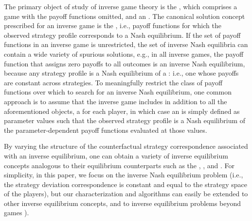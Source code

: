 The primary object of study of inverse game theory is the , which comprises a 
game with the 
payoff functions omitted, and an .
The canonical solution concept prescribed for an inverse game is the , i.e., payoff functions 
for which the observed strategy profile corresponds to a Nash equilibrium.
%
%
If the set of payoff functions in an inverse game is unrestricted, the set of inverse Nash equilibria can contain a wide variety of spurious solutions, e.g., in all inverse games, the payoff function that assigns zero payoffs to all outcomes is an inverse Nash equilibrium, because any strategy profile is a Nash equilibrium of a : i.e., one whose payoffs are constant across strategies. 
To meaningfully restrict the class of payoff functions over which to search for an inverse Nash equilibrium, one common approach \citep{kuleshov2015inverse, syrgkanis2017inference} is to assume that the inverse game includes in addition to all the aforementioned objects, a  
for each player, in which case an  is simply defined as parameter values such that the observed strategy profile is a Nash equilibrium of the parameter-dependent payoff functions evaluated at those values. 

By varying the structure of the counterfactual strategy correspondence associated with an inverse equilibrium, one can obtain a variety of inverse equilibrium concepts analogous to their equilibrium counterparts such as the  \citep{kuleshov2015inverse}, , and  \citep{bestick2013inverse, waugh2013computational}.
For simplicity, in this paper, we focus on the inverse Nash equilibrium problem (i.e., the strategy deviation correspondence is constant and equal to the strategy space of the players), but our characterization and algorithms can easily be extended to other inverse equilibrium concepts, and to inverse equilibrium problems beyond games \citep{arrow-debreu, facchinei2010generalized}).
\fi

